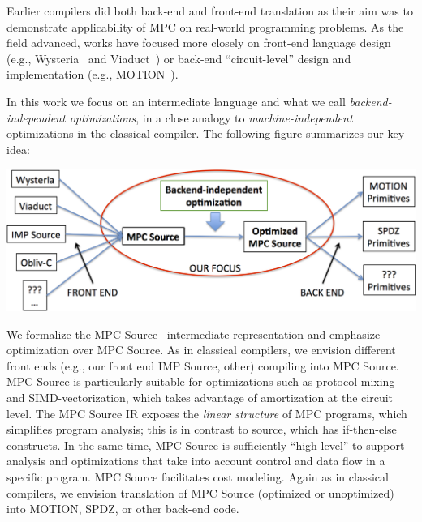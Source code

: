 Earlier compilers did both back-end and front-end translation as their aim was to demonstrate applicability of MPC on real-world
programming problems. As the field advanced, works have focused more closely on front-end language design (e.g., Wysteria~\cite{Rastogi:2014} and Viaduct~\cite{Acay:2021})
or back-end ``circuit-level'' design and implementation (e.g., MOTION~\cite{Braun:2022}).

In this work we focus on an intermediate language and what we call \emph{backend-independent optimizations}, in a close analogy to \emph{machine-independent} optimizations
in the classical compiler. The following figure summarizes our key idea:

{\begin{center}
\includegraphics[width=0.8\linewidth]{figs_paper_SIMD/focus.png}
\end{center}
}

We formalize the MPC Source~\cite{Ishaq:2019} intermediate representation and emphasize optimization over MPC Source. As in classical compilers, we envision different front ends (e.g., our front end IMP Source, other) compiling into MPC Source. MPC Source is particularly suitable for optimizations such as protocol mixing~\cite{Buscher:2018b,Ishaq:2019, Fang:2022} and SIMD-vectorization,
which takes advantage of amortization at the circuit level. The MPC Source IR exposes the \emph{linear structure} of MPC programs, which simplifies program analysis; this is
in contrast to source, which has if-then-else constructs. In the same time, MPC Source is sufficiently ``high-level''  to support analysis and optimizations that take into account
control and data flow in a specific program. MPC Source facilitates cost modeling. 
Again as in classical compilers, we envision translation of MPC Source (optimized or unoptimized) into MOTION, SPDZ, or other back-end code.




